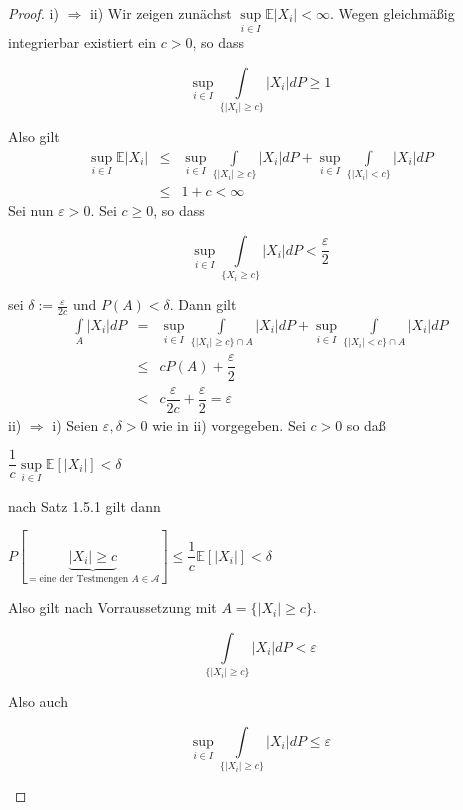 \documentclass[10pt,a4paper]{report}
\newcommand{\E}{\mathbb{E}}
\numberwithin{equation}{section}
\numberwithin{figure}{section}
\theoremstyle{plain}
\theoremstyle{definition}
\theoremstyle{remark}
\theoremstyle{plain}
\newcommand{\1}{ \mathbb{1} } %
\begin{document}
\begin{proof} 
  i) $\Rightarrow$ ii) Wir zeigen zunächst $\sup\limits_{i \in I}
  \E|X_i| < \infty$. Wegen gleichmäßig integrierbar existiert ein $c>0$, so dass
  \begin{center}
    \[\sup\limits_{i \in I} \int\limits_{\{|X_i|\geq c\}}|X_i|dP\geq
    1\]
  \end{center}
  Also gilt
  \begin{eqnarray*}
    \sup\limits_{i \in I} \E|X_i| &\leq& \sup\limits_{i \in I}\int\limits_{\{|X_i|\geq c\}}|X_i|dP+ \sup\limits_{i \in I}\int\limits_{\{|X_i|< c\}}|X_i|dP\\
    &\leq & 1+c < \infty 
  \end{eqnarray*}
  Sei nun $\varepsilon >0$. Sei $c\geq 0$, so dass
  \begin{center}
    \[\sup\limits_{i \in I} \int\limits_{\{X_i \geq c\}}|X_i|dP
    <\dfrac{\varepsilon}{2}\]
  \end{center}
  sei $ \delta:=\frac{\varepsilon}{2c}$ und $P(A)<\delta$. Dann gilt
  \begin{eqnarray*}
    \int\limits_A|X_i|dP&=&\sup\limits_{i \in I}\int\limits_{\{|X_i|\geq c\}\cap A}|X_i|dP+ \sup\limits_{i \in I}\int\limits_{\{|X_i|< c\}\cap A}|X_i|dP\\
    &\leq & cP(A)+\dfrac{\varepsilon}{2}\\
    &<& c\dfrac{\varepsilon}{2c}+\dfrac{\varepsilon}{2}=\varepsilon
  \end{eqnarray*}
  ii) $\Rightarrow$ i) Seien $\varepsilon, \delta >0 $ wie in ii)
  vorgegeben. Sei $c>0$ so daß
  \begin{center}
    $\dfrac{1}{c}\sup\limits_{i \in I} \E[|X_i|]<\delta$
  \end{center}
  nach Satz 1.5.1 gilt dann
  \begin{center}
    $P[\underbrace{|X_i|\geq c}_{= \text{eine der Testmengen } A \in
      \mathcal{A}}]\leq \dfrac{1}{c}\E[|X_i|]<\delta$
  \end{center}
  Also gilt nach Vorraussetzung mit $A=\{|X_i|\geq c\}$.
  \begin{center}
    \[\int\limits_{\{|X_i|\geq c\}}|X_i|dP < \varepsilon\]
  \end{center}
  Also auch
  \begin{center}
    \[\sup\limits_{i \in I}\int\limits_{\{|X_i|\geq c\}}|X_i|dP \leq
    \varepsilon \] 
  \end{center}
\end{proof}
\end{document}
